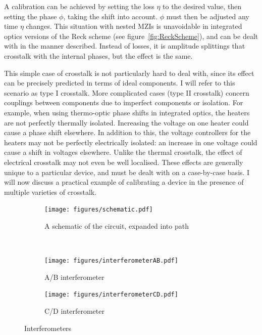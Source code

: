 A calibration can be achieved by setting the loss \(\eta\) to the desired value,
then setting the phase \(\phi\), taking the shift into account. \(\phi\) must
then be adjusted any time \(\eta\) changes. This situation with nested MZIs is
unavoidable in integrated optics versions of the Reck scheme (see
figure~\ref{fig:ReckScheme}), and can be dealt with in the manner described.
Instead of losses, it is amplitude splittings that crosstalk with the internal
phases, but the effect is the same.

This simple case of crosstalk is not particularly hard to deal with, since its
effect can be precisely predicted in terms of ideal components. I will refer to
this scenario as type I crosstalk. More complicated cases (type II crosstalk)
concern couplings between components due to imperfect components or
isolation. For example, when using thermo-optic phase shifts in integrated
optics, the heaters are not perfectly thermally isolated. Increasing the voltage
on one heater could cause a phase shift elsewhere. In addition to this, the
voltage controllers for the heaters may not be perfectly electrically isolated:
an increase in one voltage could cause a shift in voltages elsewhere. Unlike the
thermal crosstalk, the effect of electrical crosstalk may not even be well
localised. These effects are generally unique to a particular device, and must
be dealt with on a case-by-case basis. I will now discuss a practical example of
calibrating a device in the presence of multiple varieties of crosstalk.

\begin{figure}[t]
  \centering
  \begin{subfigure}{\textwidth}
    \texttt{[image: figures/schematic.pdf]}
    \caption{A schematic of the circuit, expanded into path}
    \label{fig:schematic}
  \end{subfigure} \\
  \vspace{1cm}
  \begin{subfigure}{0.45\textwidth}
    \texttt{[image: figures/interferometerAB.pdf]}
    \caption{A/B interferometer}
    \label{fig:ab}
  \end{subfigure}
  \hspace{0.05\textwidth}
  \begin{subfigure}{0.45\textwidth}
    \texttt{[image: figures/interferometerCD.pdf]}
    \caption{C/D interferometer}
    \label{fig:cd}
  \end{subfigure}
  \caption[Illustration of nested interferometers in the bulk Reck scheme]
  {Interferometers}
  \label{fig:interferometers}
\end{figure}

